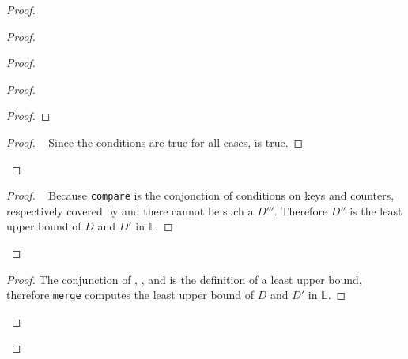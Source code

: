 \documentclass[11pt, oneside]{article}   	%
\begin{document}
\begin{proof}
\begin{proof}
\begin{proof}
\begin{proof}
\begin{proof}
				\end{proof}
				
				\qedstep
				\begin{proof}
					\pf~ Since the conditions are true for all cases,  is true.
				\end{proof}
			\end{proof}
			
			\qedstep
			\begin{proof}
				\pf~ Because \texttt{compare} is the conjonction of conditions on keys and counters, respectively covered by  and  there cannot be such a $D'''$. Therefore $D''$ is the least upper bound of $D$ and $D'$ in $\mathds{L}$.
			\end{proof}
		\end{proof}
		
		\qedstep
		\begin{proof}
			The conjunction of , , and  is the definition of a least upper bound, therefore  \texttt{merge} computes the least upper bound of $D$ and $D'$ in $\mathds{L}$.
		\end{proof}	
	\end{proof}
	

\end{proof}
\end{document}

